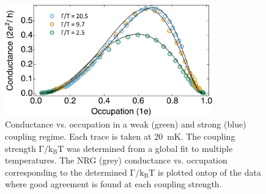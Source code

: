 \begin{figure}[ht]
  \begin{center}
    \includegraphics[width=0.8\textwidth]{figures/ch3/crop_FiguresMaster.015.png}
    \caption[Conductance vs. Occupation : Varying the coupling strength between the quantum dot and leads]{\label{fig:ch3/cond_occ_couplingstrength} 
    Conductance vs. occupation in a weak (green) and strong (blue) coupling regime. Each trace is taken at \qty{20}{mK}. The coupling strength $\mathrm{\Gamma/k_BT}$ was determined from a global fit to multiple temperatures. The NRG (grey) conductance vs. occupation corresponding to the determined $\mathrm{\Gamma/k_BT}$ is plotted ontop of the data where good agreement is found at each coupling strength.}
  \end{center}
\end{figure}


